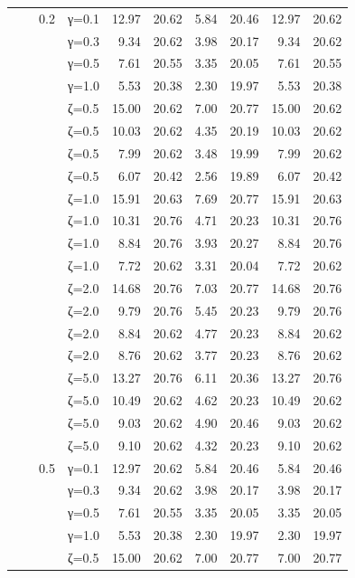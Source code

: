 \begin{table}[htbp]
\begin{tabular}{ll r l  rr  rr  rr}
  &  & 0.2 & γ=0.1 & 12.97 & 20.62 & 5.84 & 20.46 & 12.97 & 20.62 \\
  &  &  & γ=0.3 & 9.34 & 20.62 & 3.98 & 20.17 & 9.34 & 20.62 \\
  &  &  & γ=0.5 & 7.61 & 20.55 & 3.35 & 20.05 & 7.61 & 20.55 \\
  &  &  & γ=1.0 & 5.53 & 20.38 & 2.30 & 19.97 & 5.53 & 20.38 \\
  &  &  & ζ=0.5 & 15.00 & 20.62 & 7.00 & 20.77 & 15.00 & 20.62 \\
  &  &  & ζ=0.5 & 10.03 & 20.62 & 4.35 & 20.19 & 10.03 & 20.62 \\
  &  &  & ζ=0.5 & 7.99 & 20.62 & 3.48 & 19.99 & 7.99 & 20.62 \\
  &  &  & ζ=0.5 & 6.07 & 20.42 & 2.56 & 19.89 & 6.07 & 20.42 \\
  &  &  & ζ=1.0 & 15.91 & 20.63 & 7.69 & 20.77 & 15.91 & 20.63 \\
  &  &  & ζ=1.0 & 10.31 & 20.76 & 4.71 & 20.23 & 10.31 & 20.76 \\
  &  &  & ζ=1.0 & 8.84 & 20.76 & 3.93 & 20.27 & 8.84 & 20.76 \\
  &  &  & ζ=1.0 & 7.72 & 20.62 & 3.31 & 20.04 & 7.72 & 20.62 \\
  &  &  & ζ=2.0 & 14.68 & 20.76 & 7.03 & 20.77 & 14.68 & 20.76 \\
  &  &  & ζ=2.0 & 9.79 & 20.76 & 5.45 & 20.23 & 9.79 & 20.76 \\
  &  &  & ζ=2.0 & 8.84 & 20.62 & 4.77 & 20.23 & 8.84 & 20.62 \\
  &  &  & ζ=2.0 & 8.76 & 20.62 & 3.77 & 20.23 & 8.76 & 20.62 \\
  &  &  & ζ=5.0 & 13.27 & 20.76 & 6.11 & 20.36 & 13.27 & 20.76 \\
  &  &  & ζ=5.0 & 10.49 & 20.62 & 4.62 & 20.23 & 10.49 & 20.62 \\
  &  &  & ζ=5.0 & 9.03 & 20.62 & 4.90 & 20.46 & 9.03 & 20.62 \\
  &  &  & ζ=5.0 & 9.10 & 20.62 & 4.32 & 20.23 & 9.10 & 20.62 \\
  &  & 0.5 & γ=0.1 & 12.97 & 20.62 & 5.84 & 20.46 & 5.84 & 20.46 \\
  &  &  & γ=0.3 & 9.34 & 20.62 & 3.98 & 20.17 & 3.98 & 20.17 \\
  &  &  & γ=0.5 & 7.61 & 20.55 & 3.35 & 20.05 & 3.35 & 20.05 \\
  &  &  & γ=1.0 & 5.53 & 20.38 & 2.30 & 19.97 & 2.30 & 19.97 \\
  &  &  & ζ=0.5 & 15.00 & 20.62 & 7.00 & 20.77 & 7.00 & 20.77 \\

\end{tabular}
\end{table}
